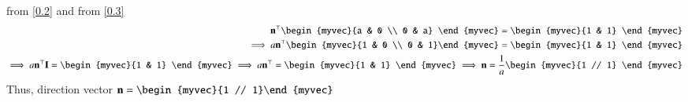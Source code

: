 \documentclass[journal]{IEEEtran}
\begin{document}
		from \eqref{0.2} and from \eqref{0.3}
		\begin{align}
		\vec{n}^\top\begin{myvec}{a & 0 \\ 0 & a} \end{myvec} = \begin{myvec}{1 & 1} \end{myvec} \\
		\implies a\vec{n}^\top\begin{myvec}{1 & 0 \\ 0 & 1}\end{myvec} = \begin{myvec}{1 & 1} \end{myvec}\\
		\implies a\vec{n}^\top\vec{I} = \begin{myvec}{1 & 1} \end{myvec}
		\implies a\vec{n}^\top = \begin{myvec}{1 & 1} \end{myvec}
		\implies \vec{n} = \frac{1}{a}\begin{myvec}{1 // 1} \end{myvec}
		\end{align}
		Thus, direction vector $\vec{n} = \begin{myvec}{1 // 1}\end{myvec}$
		
\end{document}
